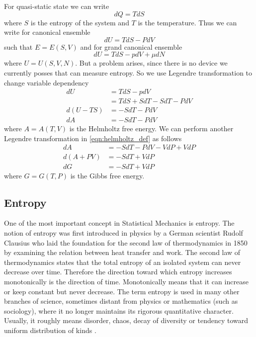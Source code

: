 	For quasi-static state we can write
	\begin{equation}
	dQ = T dS
	\label{eqn:def_enthalpy}
	\end{equation}
	where $S$ is the entropy of the system and $T$ is the temperature.
	Thus we can write for canonical ensemble
	\begin{equation}
	dU = TdS - PdV
	\label{def:internal-energy--entropy-volumn}
	\end{equation}
	such that $E=E(S,V)$  and 
	for grand canonical ensemble 
	\begin{equation}
	dU = TdS - pdV + \mu dN
	\end{equation}
	where $U=U(S,V,N)$.
	But a problem arises, since there is no device we currently posses that can measure entropy. So we use Legendre transformation to change variable dependency
	\begin{align}
		dU  	&= TdS - pdV  \nonumber \\ 
		&= TdS + SdT - SdT - PdV  \nonumber \\ 
		d(U-TS) &= -SdT - PdV  \nonumber \\
		dA 		&= -SdT - PdV \label{eqn:helmholtz_def}
	\end{align}
	where $A=A(T,V)$  is the Helmholtz free energy. We can perform another Legendre transformation in \ref{eqn:helmholtz_def} as follows
	\begin{align}
		dA 		&= -SdT - PdV -VdP + VdP \nonumber \\
		d(A+PV) &= -SdT + VdP \nonumber \\
		dG      &= -SdT + VdP \label{eqn:gibbs_def}
	\end{align}
	where $G=G(T,P)$ is the Gibbs free energy.
	
	
	\subsection{Entropy}
	\label{subsect:entropy-thermodynamics}
	One of the most important concept in Statistical Mechanics is entropy. The notion of entropy was first introduced in physics by a German scientist Rudolf Clausius who laid the foundation for the second law of thermodynamics in 1850 by examining the relation between heat transfer and work.
	The second law of thermodynamics states that the total entropy of an isolated system can never decrease over time. Therefore the direction toward which entropy increases monotonically is the direction of time. Monotonically means that it can increase or keep constant but never decrease.	The term entropy	is used in many other branches of science, sometimes distant from physics or mathematics (such	as sociology), where it no longer maintains its rigorous quantitative character. Usually, it roughly	means disorder, chaos, decay of diversity or tendency toward uniform distribution of kinds \cite{Downarowicz2009}.
	

